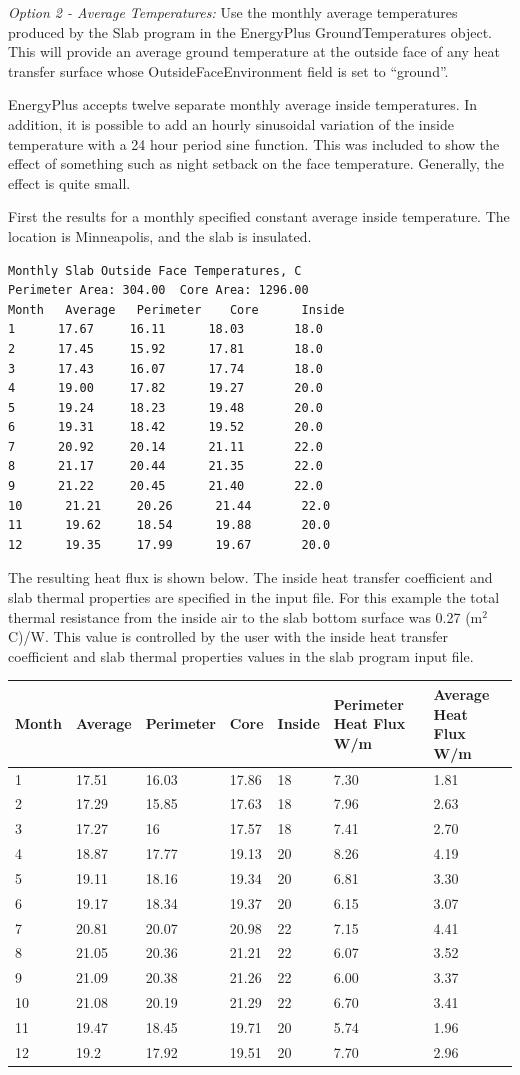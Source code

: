 \emph{Option 2 - Average Temperatures:} Use the monthly average temperatures produced by the Slab program in the EnergyPlus GroundTemperatures object. This will provide an average ground temperature at the outside face of any heat transfer surface whose OutsideFaceEnvironment field is set to ``ground''.

EnergyPlus accepts twelve separate monthly average inside temperatures. In addition, it is possible to add an hourly sinusoidal variation of the inside temperature with a 24 hour period sine function. This was included to show the effect of something such as night setback on the face temperature. Generally, the effect is quite small.

First the results for a monthly specified constant average inside temperature. The location is Minneapolis, and the slab is insulated.

\begin{lstlisting}
Monthly Slab Outside Face Temperatures, C
Perimeter Area: 304.00  Core Area: 1296.00
Month   Average   Perimeter    Core      Inside
1      17.67     16.11      18.03       18.0
2      17.45     15.92      17.81       18.0
3      17.43     16.07      17.74       18.0
4      19.00     17.82      19.27       20.0
5      19.24     18.23      19.48       20.0
6      19.31     18.42      19.52       20.0
7      20.92     20.14      21.11       22.0
8      21.17     20.44      21.35       22.0
9      21.22     20.45      21.40       22.0
10      21.21     20.26      21.44       22.0
11      19.62     18.54      19.88       20.0
12      19.35     17.99      19.67       20.0
\end{lstlisting}

The resulting heat flux is shown below. The inside heat transfer coefficient and slab thermal properties are specified in the input file. For this example the total thermal resistance from the inside air to the slab bottom surface was 0.27 (m\(^{2}\) C)/W. This value is controlled by the user with the inside heat transfer coefficient and slab thermal properties values in the slab program input file.

\begin{longtable}[c]{p{0.85in}p{0.85in}p{0.85in}p{0.85in}p{0.85in}p{0.85in}p{0.85in}}
\toprule 
Month & Average & Perimeter & Core & Inside & Perimeter Heat Flux W/m & Average Heat Flux W/m \tabularnewline \midrule
\endhead
1 & 17.51 & 16.03 & 17.86 & 18 & 7.30 & 1.81 \tabularnewline
2 & 17.29 & 15.85 & 17.63 & 18 & 7.96 & 2.63 \tabularnewline
3 & 17.27 & 16 & 17.57 & 18 & 7.41 & 2.70 \tabularnewline
4 & 18.87 & 17.77 & 19.13 & 20 & 8.26 & 4.19 \tabularnewline
5 & 19.11 & 18.16 & 19.34 & 20 & 6.81 & 3.30 \tabularnewline
6 & 19.17 & 18.34 & 19.37 & 20 & 6.15 & 3.07 \tabularnewline
7 & 20.81 & 20.07 & 20.98 & 22 & 7.15 & 4.41 \tabularnewline
8 & 21.05 & 20.36 & 21.21 & 22 & 6.07 & 3.52 \tabularnewline
9 & 21.09 & 20.38 & 21.26 & 22 & 6.00 & 3.37 \tabularnewline
10 & 21.08 & 20.19 & 21.29 & 22 & 6.70 & 3.41 \tabularnewline
11 & 19.47 & 18.45 & 19.71 & 20 & 5.74 & 1.96 \tabularnewline
12 & 19.2 & 17.92 & 19.51 & 20 & 7.70 & 2.96 \tabularnewline
\bottomrule
\end{longtable}

